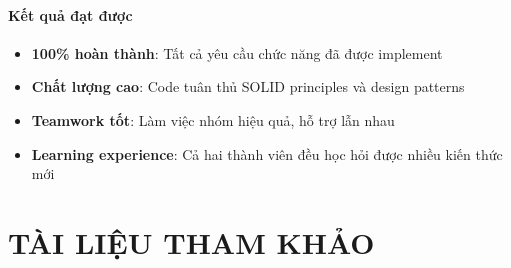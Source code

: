 \documentclass[12pt,a4paper]{article}
\begin{document}
 \paragraph{Kết quả đạt được}
 \begin{itemize}
     \item \textbf{100\% hoàn thành}: Tất cả yêu cầu chức năng đã được implement
     \item \textbf{Chất lượng cao}: Code tuân thủ SOLID principles và design patterns
     \item \textbf{Teamwork tốt}: Làm việc nhóm hiệu quả, hỗ trợ lẫn nhau
     \item \textbf{Learning experience}: Cả hai thành viên đều học hỏi được nhiều kiến thức mới
 \end{itemize}

\section{TÀI LIỆU THAM KHẢO}
\end{document}
